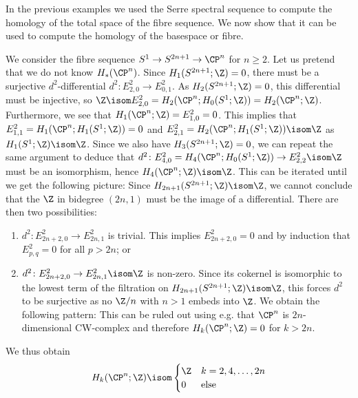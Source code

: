 In the previous examples we used the Serre spectral sequence to compute the homology of the total space of the fibre sequence.
We now show that it can be used to compute the homology of the basespace or fibre.
\begin{example}
	We consider the fibre sequence $S^1 \to S^{2n + 1} \to \CP^n$ for $n \geq 2$.
	Let us pretend that we do not know $H_*(\CP^n)$.
	Since $H_1(S^{2n + 1}; \Z) = 0$, there must be a surjective $d^2$-differential $d^2\colon E^2_{2, 0} \to E^2_{0, 1}$.
	As $H_2(S^{2n + 1}; \Z) = 0$, this differential must be injective, so $\Z \isom E^2_{2, 0} = H_2(\CP^n; H_0(S^1; \Z)) = H_2(\CP^n; \Z)$.
	Furthermore, we see that $H_1(\CP^n; \Z) = E^2_{1, 0} = 0$.
	This implies that $E^2_{1, 1} = H_1(\CP^n; H_1(S^1; \Z)) = 0$ and $E^2_{2, 1} = H_2(\CP^n; H_1(S^1; \Z)) \isom \Z$ as $H_1(S^1; \Z) \isom \Z$.
	Since we also have $H_3(S^{2n + 1}; \Z) = 0$, we can repeat the same argument to deduce that $d^2\colon E^2_{4, 0} = H_4(\CP^n; H_0(S^1; \Z)) \to E^2_{2, 2} \isom \Z$ must be an isomorphism, hence $H_4(\CP^n; \Z) \isom \Z$.
	This can be iterated until we get the following picture: %
	Since $H_{2n + 1}(S^{2n + 1}; \Z) \isom \Z$, we cannot conclude that the $\Z$ in bidegree $(2n, 1)$ must be the image of a differential.
	There are then two possibilities:
	\begin{enumerate}
		\item $d^2\colon E^2_{2n + 2, 0} \to E^2_{2n, 1}$ is trivial.
			This implies $E^2_{2n + 2, 0} = 0$ and by induction that $E^2_{p, q} = 0$ for all $p > 2n$; or
		\item $d^2\colon E^2_{2n + 2, 0} \to E^2_{2n, 1} \isom \Z$ is non-zero.
			Since its cokernel is isomorphic to the lowest term of the filtration on $H_{2n + 1}(S^{2n + 1}; \Z) \isom \Z$, this forces $d^2$ to be surjective as no $\Zn{n}$ with $n > 1$ embeds into $\Z$.
			We obtain the following pattern: %
			This can be ruled out using e.g. that $\CP^n$ is $2n$-dimensional CW-complex and therefore $H_k(\CP^n; \Z) = 0$ for $k > 2n$.
	\end{enumerate}
	We thus obtain 
	\begin{equation*}
		H_k(\CP^n; \Z) \isom \begin{cases}
			\Z & k = 2, 4, \ldots, 2n \\
			0  & \text{else}
		\end{cases}
	\end{equation*}
\end{example}

